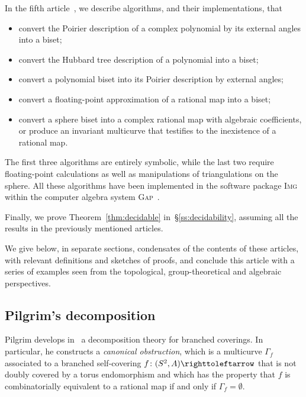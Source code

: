 \documentclass{amsart}
\begin{document}
In the fifth article~\cite{bartholdi-dudko:bc5}, we describe
algorithms, and their implementations, that
\begin{itemize}
\item convert the Poirier description of a complex polynomial by its
  external angles into a biset;
\item convert the Hubbard tree description of a polynomial into a
  biset;
\item convert a polynomial biset into its Poirier description by
  external angles;
\item convert a floating-point approximation of a rational map into a
  biset;
\item convert a sphere biset into a complex rational map with
  algebraic coefficients, or produce an invariant multicurve that
  testifies to the inexistence of a rational map.
\end{itemize}
The first three algorithms are entirely symbolic, while the last two
require floating-point calculations as well as manipulations of
triangulations on the sphere. All these algorithms have been
implemented in the software package \textsc{Img}~\cite{img:manual}
within the computer algebra system \textsc{Gap}~\cite{gap4.5:manual}.

Finally, we prove Theorem~\ref{thm:decidable}
in~\S\ref{ss:decidability}, assuming all the results in the previously
mentioned articles.

We give below, in separate sections, condensates of the contents of
these articles, with relevant definitions and sketches of proofs, and
conclude this article with a series of examples seen from the
topological, group-theoretical and algebraic perspectives.

\subsection{Pilgrim's decomposition}\label{ss:canonical decomposition}
Pilgrim develops in~\cite{pilgrim:combinations} a decomposition theory
for branched coverings. In particular, he constructs a \emph{canonical
  obstruction}, which is a multicurve $\Gamma_f$ associated to a
branched self-covering $f\colon(S^2,A)\selfmap$ that is not doubly
covered by a torus endomorphism and which has the property that $f$ is
combinatorially equivalent to a rational map if and only if
$\Gamma_f=\emptyset$.
\end{document}
